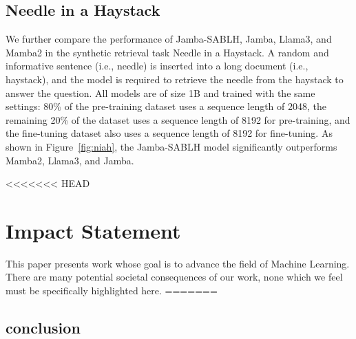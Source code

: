 \documentclass{article}
\theoremstyle{plain}
\theoremstyle{definition}
\theoremstyle{remark}
\begin{document}
\subsection{Needle in a Haystack}

We further compare the performance of Jamba-SABLH, Jamba, Llama3, and Mamba2 in the synthetic retrieval task Needle in a Haystack. A random and informative sentence (i.e., needle) is inserted into a long document (i.e., haystack), and the model is required to retrieve the needle from the haystack to answer the question. All models are of size 1B and trained with the same settings: 80\% of the pre-training dataset uses a sequence length of 2048, the remaining 20\% of the dataset uses a sequence length of 8192 for pre-training, and the fine-tuning dataset also uses a sequence length of 8192 for fine-tuning. As shown in Figure~\ref{fig:niah}, the Jamba-SABLH model significantly outperforms Mamba2, Llama3, and Jamba.

<<<<<<< HEAD
\section*{Impact Statement}

This paper presents work whose goal is to advance the field of 
Machine Learning. There are many potential societal consequences 
of our work, none which we feel must be specifically highlighted here.
=======
\subsection{conclusion}
\end{document}
